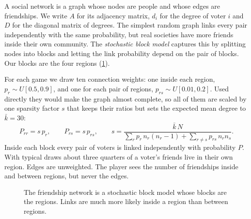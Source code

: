 \documentclass[11pt,a4paper,oneside]{report}
\begin{document}
A social network is a graph whose nodes are people and whose edges are friendships. We write $A$ for its
adjacency matrix, $d_i$ for the degree of voter $i$ and $D$ for the diagonal matrix of degrees. The
simplest random graph links every pair independently with the same probability, but real
societies have more friends inside their own community. The \emph{stochastic block model}
captures this by splitting nodes into blocks and letting the link probability depend on the pair of blocks.
Our blocks are the four regions (\cref{fig:sbm}).

For each game we draw ten connection weights: one inside each region, $p_r \sim U[0.5, 0.9]$, and one for
each pair of regions, $p_{rs} \sim U[0.01, 0.2]$. Used directly they would make the graph almost complete,
so all of them are scaled by one sparsity factor $s$ that keeps their ratios but sets the expected mean
degree to $\bar k = 30$:
\begin{equation}
  P_{rr} = s\,p_r, \qquad P_{rs} = s\,p_{rs}, \qquad
  s = \frac{\bar k\,N}{\sum_r p_r\,n_r(n_r-1) + \sum_{r\neq s} p_{rs}\,n_r n_s}.
\end{equation}
Inside each block every pair of voters is linked independently with probability $P$. With typical draws
about three quarters of a voter's friends live in their own region. Edges are unweighted. The player sees
the number of friendships inside and between regions, but never the edges.

\begin{figure}[t]
\centering
{}
\caption{The friendship network is a stochastic block model whose blocks are the regions. Links are much
more likely inside a region than between regions.}
\label{fig:sbm}
\end{figure}
\end{document}
